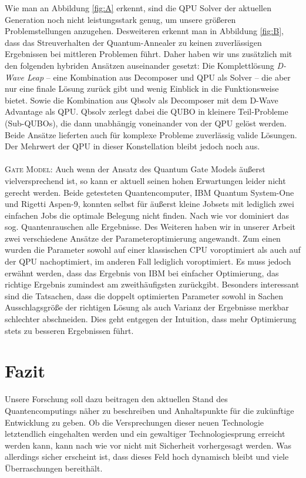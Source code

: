 \documentclass[twoside,twocolumn]{article}
\begin{document}
  \vspace{-5pt}

Wie man an Abbildung \ref{fig:A} erkennt, sind die QPU Solver der aktuellen Generation noch nicht leistungsstark genug, um unsere größeren Problemstellungen anzugehen. Desweiteren erkennt man in Abbildung \ref{fig:B}, dass das Streuverhalten der Quantum-Annealer zu keinen zuverlässigen Ergebnissen bei mittleren Problemen führt. Daher haben wir uns zusätzlich mit den folgenden hybriden Ansätzen auseinander gesetzt: Die Komplettlösung \textit{D-Wave Leap} -- eine Kombination aus Decomposer und QPU als Solver -- die aber nur eine finale Lösung zurück gibt und wenig Einblick in die Funktionsweise bietet. Sowie die Kombination aus Qbsolv als Decomposer mit dem D-Wave Advantage als QPU. Qbsolv zerlegt dabei die QUBO in kleinere Teil-Probleme (Sub-QUBOs), die dann unabhängig voneinander von der QPU gelöst werden. Beide Ansätze lieferten auch für komplexe Probleme zuverlässig valide Lösungen. Der Mehrwert der QPU in dieser Konstellation bleibt jedoch noch aus.\\\\
\textsc{Gate Model:} Auch wenn der Ansatz des Quantum Gate Models äußerst vielversprechend ist, so kann er aktuell seinen hohen Erwartungen leider nicht gerecht werden. Beide getesteten Quantencomputer, IBM Quantum System-One und Rigetti Aspen-9, konnten selbst für äußerst kleine Jobsets mit lediglich zwei einfachen Jobs die optimale Belegung nicht finden. 
Nach wie vor dominiert das sog. Quantenrauschen alle Ergebnisse. Des Weiteren haben wir in unserer Arbeit zwei verschiedene Ansätze der Parameteroptimierung angewandt. Zum einen wurden die Parameter sowohl auf einer klassischen CPU voroptimiert als auch auf der QPU nachoptimiert, im anderen Fall lediglich voroptimiert.
Es muss jedoch erwähnt werden, dass das Ergebnis von IBM bei einfacher Optimierung, das richtige Ergebnis zumindest am zweithäufigsten zurückgibt. Besonders interessant sind die Tatsachen, dass die doppelt optimierten Parameter sowohl in Sachen Ausschlagsgröße der richtigen Lösung als auch Varianz der Ergebnisse merkbar schlechter abschneiden. Dies geht entgegen der Intuition, dass mehr Optimierung stets zu besseren Ergebnissen führt.

\section{Fazit}
Unsere Forschung soll dazu beitragen den aktuellen Stand des Quantencomputings näher zu beschreiben und Anhaltspunkte für die zukünftige Entwicklung zu geben. Ob die Versprechungen dieser neuen Technologie letztendlich eingehalten werden und ein gewaltiger Technologiesprung erreicht werden kann, kann nach wie vor nicht mit Sicherheit vorhergesagt werden.  Was allerdings sicher erscheint ist, dass dieses Feld hoch dynamisch bleibt und viele Überraschungen bereithält. 
\end{document}
